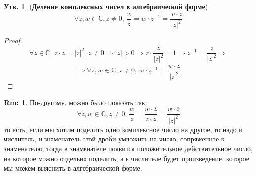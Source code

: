 \documentclass[12pt]{article}
\newcommand{\MC}{\mathbb{C}}
\theoremstyle{definition}
\newtheorem{rem}{Rm:}
\newtheorem{prop}{Утв.}
\newcommand{\ovl}[1]{\overline{#1}}
\begin{document}
\begin{prop}(\textbf{Деление комплексных чисел в алгебраической форме})
	$$
		\forall z,w \in \MC, z \neq 0, \, \dfrac{w}{z} = w{\cdot}z^{-1} = \dfrac{w{\cdot}\ovl{z}}{|z|^2}
	$$
\end{prop}
\begin{proof}
	$$
		\forall z \in \MC, \, z{\cdot}\ovl{z} = |z|^2, \, z \neq 0 \Rightarrow |z| > 0 \Rightarrow z{\cdot}\dfrac{\ovl{z}}{|z|^2} = 1 \Rightarrow z^{-1} = \dfrac{\ovl{z}}{|z|^2} \Rightarrow 
	$$
	$$	
		\Rightarrow \forall z,w \in \MC, z \neq 0, \,  w{\cdot}z^{-1} = \dfrac{w{\cdot}\ovl{z}}{|z|^2}
	$$
\end{proof}

\begin{rem}
	По-другому, можно было показать так:
	$$
		\forall z,w \in \MC, z \neq 0, \,  \dfrac{w}{z} = \dfrac{w{\cdot}\ovl{z}}{z{\cdot}\ovl{z}} = \dfrac{w{\cdot}\ovl{z}}{|z|^2}
	$$
	то есть, если мы хотим поделить одно комплексное число на другое, то надо и числитель, и знаменатель этой дроби умножить на число, сопряженное к знаменателю, тогда в знаменателе появится положительное действительное число, на которое можно отдельно поделить, а в числителе будет произведение, которое мы можем выяснить в алгебраической форме. 
\end{rem}
\end{document}
